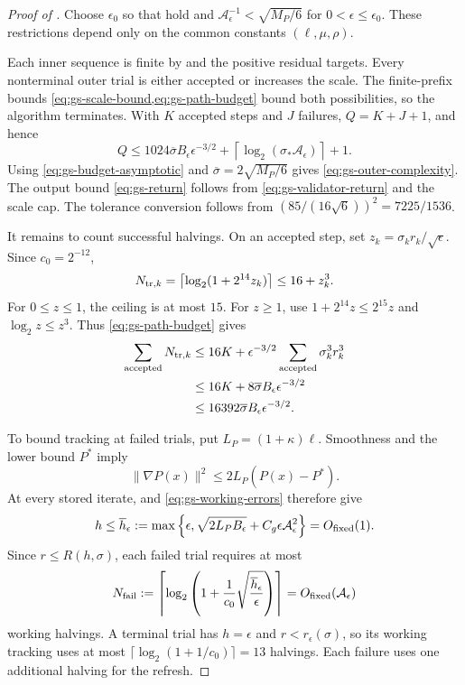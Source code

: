 \documentclass{article}
\begin{document}
\begin{proof}[Proof of ]
Choose $\epsilon_0$ so that
 hold and
$\mathcal A_\epsilon^{-1}<\sqrt{M_P/6}$ for
$0<\epsilon\le\epsilon_0$.  These restrictions depend only on the
common constants $(\ell,\mu,\rho)$.

Each inner sequence is finite by
 and the positive residual targets.
Every nonterminal outer trial is either accepted or increases the
scale.  The finite-prefix bounds
\eqref{eq:gs-scale-bound,eq:gs-path-budget} bound both possibilities,
so the algorithm terminates.  With $K$ accepted steps and $J$
failures, $Q=K+J+1$, and hence
\[
 Q\le1024\overline\sigma B_\epsilon\epsilon^{-3/2}
       +\left\lceil\log_2(\sigma_*\mathcal A_\epsilon)\right\rceil+1.
\]
Using \eqref{eq:gs-budget-asymptotic} and
$\overline\sigma=2\sqrt{M_P/6}$ gives
\eqref{eq:gs-outer-complexity}.
The output bound \eqref{eq:gs-return} follows from
\eqref{eq:gs-validator-return} and the scale cap.
The tolerance conversion follows from
$(85/(16\sqrt6))^2=7225/1536$.

It remains to count successful halvings.  On an accepted step, set
$z_k=\sigma_kr_k/\sqrt\epsilon$.  Since $c_0=2^{-12}$,
\[
 N_{{\rm tr},k}
 =\left\lceil\log_2(1+2^{14}z_k)\right\rceil
 \le16+z_k^3.
\]
For $0\le z\le1$, the ceiling is at most $15$.  For $z\ge1$, use
$1+2^{14}z\le2^{15}z$ and $\log_2z\le z^3$.
Thus \eqref{eq:gs-path-budget} gives
\begin{align}
 \sum_{\rm accepted}N_{{\rm tr},k}
 &\le16K+\epsilon^{-3/2}
                  \sum_{\rm accepted}\sigma_k^3r_k^3\notag\\
 &\le16K+8\overline\sigma B_\epsilon\epsilon^{-3/2}\notag\\
 &\le16392\overline\sigma B_\epsilon\epsilon^{-3/2}.
 \label{eq:gs-accepted-tracking}
\end{align}

To bound tracking at failed trials, put $L_P=(1+\kappa)\ell$.
Smoothness and the lower bound $P^*$ imply
\[
 \|\nabla P(x)\|^2\le2L_P(P(x)-P^*).
\]
At every stored iterate,  and
\eqref{eq:gs-working-errors} therefore give
\[
 h\le\overline h_\epsilon:=
 \max\left\{\epsilon,\sqrt{2L_PB_\epsilon}
                   +C_g\epsilon\mathcal A_\epsilon^2\right\}
 =O_{\rm fixed}(1).
\]
Since $r\le R(h,\sigma)$, each failed trial requires at most
\[
 N_{\rm fail}:=
 \left\lceil\log_2\left(
  1+\frac1{c_0}\sqrt{\frac{\overline h_\epsilon}{\epsilon}}
 \right)\right\rceil
 =O_{\rm fixed}(\mathcal A_\epsilon)
\]
working halvings.  A terminal trial has $h=\epsilon$ and
$r<r_\epsilon(\sigma)$, so its working tracking uses at most
$\lceil\log_2(1+1/c_0)\rceil=13$ halvings.
Each failure uses one additional halving for the refresh.


\end{proof}
\end{document}
